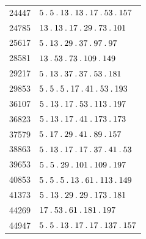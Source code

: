 \begin{longtable}{@{}r|l@{}}
24447 & $5\pdot 5\pdot 13\pdot 13\pdot 17\pdot 53\pdot 157$\\
24785 & $13\pdot 13\pdot 17\pdot 29\pdot 73\pdot 101$\\
25617 & $5\pdot 13\pdot 29\pdot 37\pdot 97\pdot 97$\\
28581 & $13\pdot 53\pdot 73\pdot 109\pdot 149$\\
29217 & $5\pdot 13\pdot 37\pdot 37\pdot 53\pdot 181$\\
29853 & $5\pdot 5\pdot 5\pdot 17\pdot 41\pdot 53\pdot 193$\\
36107 & $5\pdot 13\pdot 17\pdot 53\pdot 113\pdot 197$\\
36823 & $5\pdot 13\pdot 17\pdot 41\pdot 173\pdot 173$\\
37579 & $5\pdot 17\pdot 29\pdot 41\pdot 89\pdot 157$\\
38863 & $5\pdot 13\pdot 17\pdot 17\pdot 37\pdot 41\pdot 53$\\
39653 & $5\pdot 5\pdot 29\pdot 101\pdot 109\pdot 197$\\
40853 & $5\pdot 5\pdot 5\pdot 13\pdot 61\pdot 113\pdot 149$\\
41373 & $5\pdot 13\pdot 29\pdot 29\pdot 173\pdot 181$\\
44269 & $17\pdot 53\pdot 61\pdot 181\pdot 197$\\
44947 & $5\pdot 5\pdot 13\pdot 17\pdot 17\pdot 137\pdot 157$\\
\end{longtable}\endgroup
